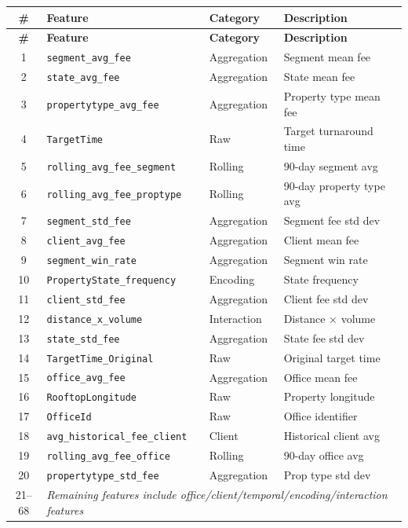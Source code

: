 \documentclass[12pt,a4paper]{article}
\begin{document}
{\small
\begin{longtable}{clll}
\toprule
\textbf{\#} & \textbf{Feature} & \textbf{Category} & \textbf{Description} \\
\midrule
\endfirsthead
\toprule
\textbf{\#} & \textbf{Feature} & \textbf{Category} & \textbf{Description} \\
\midrule
\endhead
1 & \texttt{segment\_avg\_fee} & Aggregation & Segment mean fee \\
2 & \texttt{state\_avg\_fee} & Aggregation & State mean fee \\
3 & \texttt{propertytype\_avg\_fee} & Aggregation & Property type mean fee \\
4 & \texttt{TargetTime} & Raw & Target turnaround time \\
5 & \texttt{rolling\_avg\_fee\_segment} & Rolling & 90-day segment avg \\
6 & \texttt{rolling\_avg\_fee\_proptype} & Rolling & 90-day property type avg \\
7 & \texttt{segment\_std\_fee} & Aggregation & Segment fee std dev \\
8 & \texttt{client\_avg\_fee} & Aggregation & Client mean fee \\
9 & \texttt{segment\_win\_rate} & Aggregation & Segment win rate \\
10 & \texttt{PropertyState\_frequency} & Encoding & State frequency \\
11 & \texttt{client\_std\_fee} & Aggregation & Client fee std dev \\
12 & \texttt{distance\_x\_volume} & Interaction & Distance $\times$ volume \\
13 & \texttt{state\_std\_fee} & Aggregation & State fee std dev \\
14 & \texttt{TargetTime\_Original} & Raw & Original target time \\
15 & \texttt{office\_avg\_fee} & Aggregation & Office mean fee \\
16 & \texttt{RooftopLongitude} & Raw & Property longitude \\
17 & \texttt{OfficeId} & Raw & Office identifier \\
18 & \texttt{avg\_historical\_fee\_client} & Client & Historical client avg \\
19 & \texttt{rolling\_avg\_fee\_office} & Rolling & 90-day office avg \\
20 & \texttt{propertytype\_std\_fee} & Aggregation & Prop type std dev \\
21--68 & \multicolumn{3}{l}{\textit{Remaining features include office/client/temporal/encoding/interaction features}} \\
\bottomrule
\end{longtable}
}

\end{document}
